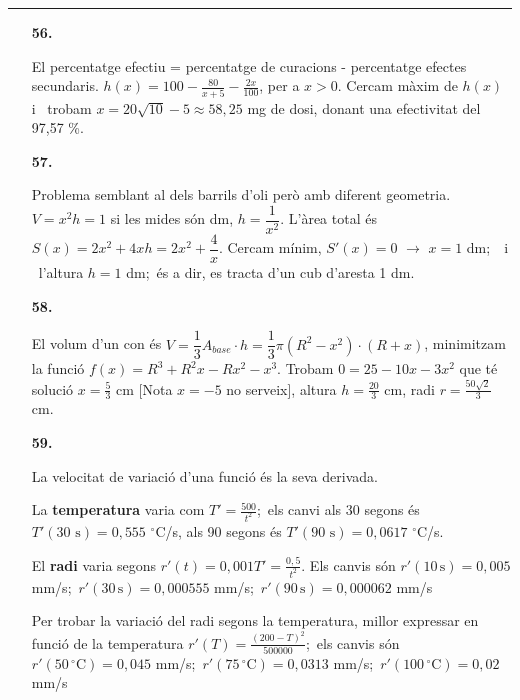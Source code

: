 \documentclass{book}
\newenvironment{pageandsol}[2][]{
\def\nonotes{#1}

\newpage

\heading{Solucions de la pàgina #2:}
\normalfont
	\vspace{0.25cm}
}{
\vspace{0.25cm}

}
\begin{document}
\vspace{0.25cm} \hrule \vspace{0.25cm}
\pagecii

\newpage


\clearemptydoublepage\normalsize
  \begin{pageandsol}{103}
  \begin{enumerate}
\item[\fontfamily{phv}\selectfont\large\color{blue}\textbf{56. }] 

El percentatge efectiu = percentatge de curacions - percentatge efectes secundaris. $h(x)=100-\frac {80}{x+5} - \frac {2x}{100}$, per a $x>0$. Cercam màxim de $h(x)$ \, i \, trobam $x=20\sqrt {10}-5\approx 58,25$ mg de dosi, donant una efectivitat del 97,57 \%.
\mbox{}\vspace{0.25cm}

\item[\fontfamily{phv}\selectfont\large\color{blue}\textbf{57. }] 

Problema semblant al dels barrils d'oli però amb diferent geometria. $V=x^2 h = 1$ si les mides són dm, $h=\dfrac {1}{x^2}$. L'àrea total és $S(x)=2 x^2 + 4x h = 2x^2 + \dfrac {4}{x}$. Cercam mínim, $S'(x)=0$ $\rightarrow $ $x=1$ dm;\, \, i \, l'altura $h=1$ dm;\, és a dir, es tracta d'un cub d'aresta 1 dm.
\mbox{}\vspace{0.25cm}

\item[\fontfamily{phv}\selectfont\large\color{blue}\textbf{58. }] 

El volum d'un con és $V=\dfrac {1}{3}A_{base}\cdot h = \dfrac {1}{3}\pi (R^2-x^2)\cdot (R+x)$, minimitzam la funció $f(x)=R^3 + R^2x-Rx^2-x^3$. Trobam $0 = 25-10x-3x^2$ que té solució $x=\frac {5}{3}$ cm [Nota $x=-5$ no serveix], altura $h=\frac {20}{3}$ cm, radi $r=\frac {50\sqrt {2}}{3}$ cm.
\mbox{}\vspace{0.25cm}

\item[\fontfamily{phv}\selectfont\large\color{blue}\textbf{59. }] 

La velocitat de variació d'una funció és la seva derivada.\par La \textbf {temperatura} varia com $T'=\frac {500}{t^2}$;\, els canvi als 30 segons és $T'(\text {30 s})=0,555$ $^\circ $C/s, als 90 segons és $T'(\text {90 s})=0,0617$ $^\circ $C/s.\par El \textbf {radi} varia segons $r'(t)=0,001 T'=\frac {0,5}{t^2}$. Els canvis són $r'(10\, \text {s})=0,005$ mm/s;\, $r'(30\, \text {s})=0,000555$ mm/s;\, $r'(90\, \text {s})= 0,000062$ mm/s \par Per trobar la variació del radi segons la temperatura, millor expressar en funció de la temperatura $r'(T)=\frac {(200-T)^2}{500 000}$;\, els canvis són $r'(50 \, {}^\circ \text {C})=0,045$ mm/s;\, $r'(75 \, {}^\circ \text {C})=0,0313$ mm/s;\, $r'(100 \, {}^\circ \text {C})=0,02$ mm/s
\mbox{}\vspace{0.25cm}


\end{enumerate}
\end{pageandsol}
\end{document}
